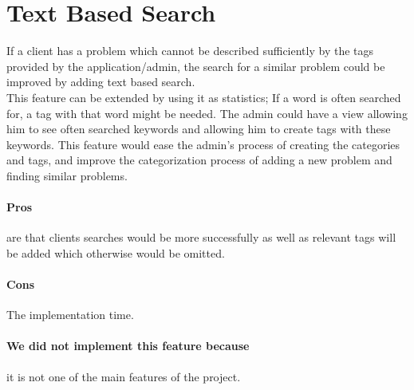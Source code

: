 \section{Text Based Search}
\label{sec:text_based_search}
If a client has a problem which cannot be described sufficiently by the tags provided by the application/admin, the search for a similar problem could be improved by adding text based search. \\
This feature can be extended by using it as statistics; If a word is often searched for, a tag with that word might be needed. 
The admin could have a view allowing him to see often searched keywords and allowing him to create tags with these keywords.
This feature would ease the admin's process of creating the categories and tags, and improve the categorization process of adding a new problem and finding similar problems.

\paragraph{Pros} are that clients searches would be more successfully as well as relevant tags will be added which otherwise would be omitted.
\paragraph{Cons} The implementation time.
\paragraph{We did not implement this feature because} it is not one of the main features of the project. 
